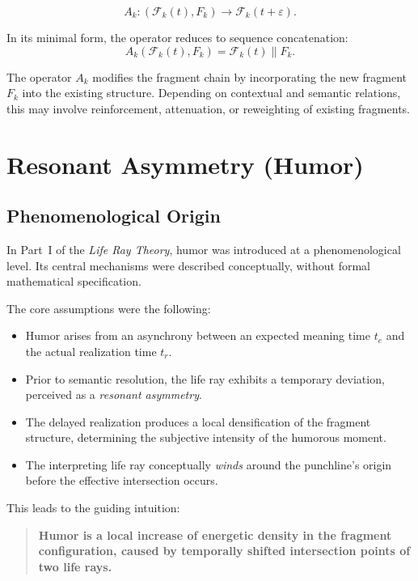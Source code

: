 \documentclass[12pt,a4paper]{article}
\begin{document}
\begin{equation}
A_k : (\mathcal{F}_k(t), F_k) \longrightarrow \mathcal{F}_k(t+\varepsilon).
\end{equation}

In its minimal form, the operator reduces to sequence concatenation:
\begin{equation}
A_k(\mathcal{F}_k(t), F_k)
= \mathcal{F}_k(t) \mathbin{\|} F_k.
\end{equation}

The operator $A_k$ modifies the fragment chain by incorporating the new fragment
$F_k$ into the existing structure. Depending on contextual and semantic relations,
this may involve reinforcement, attenuation, or reweighting of existing fragments.


\section{Resonant Asymmetry (Humor)}
\label{sec:asymmetry}

\subsection{Phenomenological Origin}

In Part~I of the \emph{Life Ray Theory}, humor was introduced at a
phenomenological level.
Its central mechanisms were described conceptually, without formal
mathematical specification.

The core assumptions were the following:
\begin{itemize}
    \item Humor arises from an asynchrony between an expected meaning time
          $t_e$ and the actual realization time $t_r$.
    \item Prior to semantic resolution, the life ray exhibits a temporary
          deviation, perceived as a \emph{resonant asymmetry}.
    \item The delayed realization produces a local densification of the
          fragment structure, determining the subjective intensity of
          the humorous moment.
    \item The interpreting life ray conceptually \emph{winds} around the
          punchline’s origin before the effective intersection occurs.
\end{itemize}

This leads to the guiding intuition:

\begin{quote}
\textbf{Humor is a local increase of energetic density in the fragment
configuration, caused by temporally shifted intersection points of
two life rays.}
\end{quote}
\end{document}

